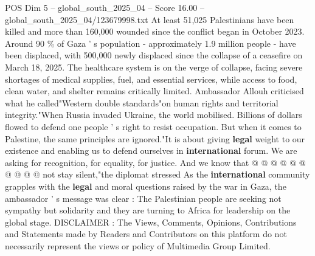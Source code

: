 \begin{textsample}{POS Dim 5 – global\_south\_2025\_04 – Score 16.00 – global\_south\_2025\_04/123679998.txt}
At least 51,025 Palestinians have been killed and more than 160,000 wounded since the conflict began in October 2023.
Around 90 \% of Gaza ' s population - approximately 1.9 million people - have been displaced, with 500,000 newly displaced since the collapse of a ceasefire on March 18, 2025.
The healthcare system is on the verge of collapse, facing severe shortages of medical supplies, fuel, and essential services, while access to food, clean water, and shelter remains critically limited.
Ambassador Allouh criticised what he called"Western double standards"on human rights and territorial integrity."When Russia invaded Ukraine, the world mobilised.
Billions of dollars flowed to defend one people ' s right to resist occupation.
But when it comes to Palestine, the same principles are ignored."It is about giving \textbf{legal} weight to our existence and enabling us to defend ourselves in \textbf{international} forum.
We are asking for recognition, for equality, for justice.
And we know that @ @ @ @ @ @ @ @ @ @ not stay silent,"the diplomat stressed As the \textbf{international} community grapples with the \textbf{legal} and moral questions raised by the war in Gaza, the ambassador ' s message was clear : The Palestinian people are seeking not sympathy but solidarity and they are turning to Africa for leadership on the global stage.
DISCLAIMER : The Views, Comments, Opinions, Contributions and Statements made by Readers and Contributors on this platform do not necessarily represent the views or policy of Multimedia Group Limited.

\end{textsample}

